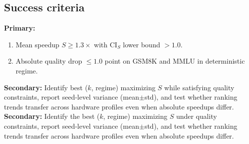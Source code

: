 \subsection{Success criteria}

\noindent\textbf{Primary:}
\begin{enumerate}
    \item Mean speedup $S \geq 1.3\times$ with CI$_S$ lower bound $>1.0$.
    \item Absolute quality drop $\leq 1.0$ point on GSM8K and MMLU in deterministic regime.
\end{enumerate}

\noindent\textbf{Secondary:} Identify best ($k$, regime) maximizing $S$ while satisfying quality constraints, report seed-level variance (mean$\pm$std), and test whether ranking trends transfer across hardware profiles even when absolute speedups differ.
\noindent\textbf{Secondary:} Identify the best ($k$, regime) maximizing $S$ under quality constraints, report seed-level variance (mean$\pm$std), and test whether ranking trends transfer across hardware profiles even when absolute speedups differ.
